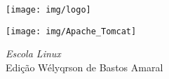 \begin{titlepage}
	\begin{center}
		\begin{minipage}{0.25\textwidth}
			\texttt{[image: img/logo]}
		\end{minipage}
		\begin{minipage}{0.7\textwidth}
			\centering
			\vspace{2cm}
			\maketitle
		\end{minipage}
	\end{center}

	\vspace{3cm}
	\begin{center}
		\texttt{[image: img/Apache\_Tomcat]}
	\end{center}

	\vspace{3cm}
	\begin{center}
		\emph{{\LARGE Escola Linux}} \\
		{\small{\ubuntu{}Edição {\tty Wélyqrson de Bastos Amaral}}}
	\end{center}
	\thispagestyle{empty}
\end{titlepage}
